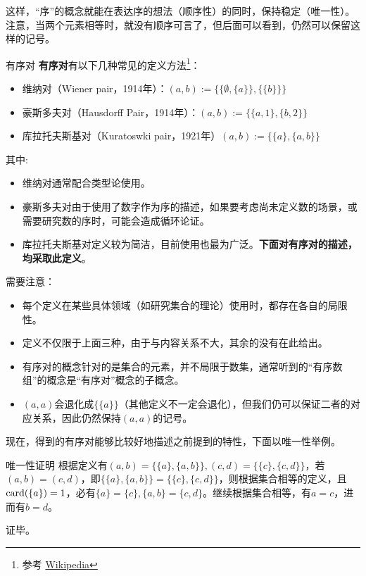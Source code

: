 这样，“序”的概念就能在表达序的想法（顺序性）的同时，保持稳定（唯一性）。注意，当两个元素相等时，就没有顺序可言了，但后面可以看到，仍然可以保留这样的记号。

\begin{definition}{有序对}
\textbf{有序对}有以下几种常见的定义方法\footnote{参考 \href{https://en.wikipedia.org/wiki/Ordered_pair}{Wikipedia}}：
\begin{itemize}
\item 维纳对（Wiener pair，1914年）：$(a, b):= \{\{\emptyset,\{ a\}\}, \{\{b\}\}\} $
\item 豪斯多夫对（Hausdorff Pair，1914年）：$ (a, b):= \{\{a, 1\}, \{b, 2\}\} $
\item 库拉托夫斯基对（Kuratoswki pair，1921年）$(a, b) := \{\{a\}, \{a, b\}\}$
\end{itemize}
\end{definition}
其中:
\begin{itemize}
\item 维纳对通常配合类型论使用。
\item 豪斯多夫对由于使用了数字作为序的描述，如果要考虑尚未定义数的场景，或需要研究数的序时，可能会造成循环论证。
\item 库拉托夫斯基对定义较为简洁，目前使用也最为广泛。\textbf{下面对有序对的描述，均采取此定义}。
\end{itemize}

需要注意：
\begin{itemize}
\item 每个定义在某些具体领域（如研究集合的理论）使用时，都存在各自的局限性。
\item 定义不仅限于上面三种，由于与内容关系不大，其余的没有在此给出。
\item 有序对的概念针对的是集合的元素，并不局限于数集，通常听到的“有序数组”的概念是“有序对”概念的子概念。
\item $(a,a)$会退化成$\{\{a\}\}$（其他定义不一定会退化），但我们仍可以保证二者的对应关系，因此仍然保持$(a,a)$的记号。
\end{itemize}

现在，得到的有序对能够比较好地描述之前提到的特性，下面以唯一性举例。

\begin{example}{唯一性证明}
根据定义有$(a, b) = \{\{a\}, \{a, b\}\} , (c, d) = \{\{c\}, \{c, d\}\} $，若$(a, b)=(c,d)$，即$\{\{a\}, \{a, b\}\}=\{\{c\}, \{c, d\}\}$，则根据集合相等的定义，且${\rm card}(\{a\})=1$，必有$\{a\}=\{c\},\{a, b\}=\{c, d\}$。继续根据集合相等，有$a=c$，进而有$b=d$。

证毕。
\end{example}

